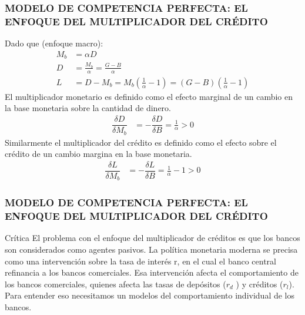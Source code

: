 \begin{frame}\frametitle{{\normalsize MODELO DE COMPETENCIA PERFECTA: EL ENFOQUE DEL MULTIPLICADOR DEL CRÉDITO} {}}
 Dado que (enfoque macro):
  \begin{align}
  M_{b}&=\alpha D   \\ \nonumber
  D&=\frac{M_{b}}{\alpha}=\frac{G-B}{\alpha}  \\ \nonumber
  L&=D-M_{b}=M_{b}\left(\frac{1}{\alpha}-1 \right)=\left(G-B \right)\left( \frac{1}{\alpha}-1\right)  
  \end{align}   
  El multiplicador monetario es definido como el efecto marginal de un cambio en la base monetaria sobre la cantidad de dinero.  
  \begin{align}
  \dfrac{\delta D}{\delta M_{b}}&=-\dfrac{\delta D}{\delta B}=\frac{1}{\alpha}>0 \nonumber
  \end{align}    
  Similarmente el multiplicador del crédito es definido como el efecto sobre el crédito de un cambio margina en la base monetaria.
  \begin{align}
  \dfrac{\delta L}{\delta M_{b}}&=-\dfrac{\delta L}{\delta B}=\frac{1}{\alpha}-1>0 \nonumber
  \end{align}   
  
\end{frame}




\begin{frame}\frametitle{{\normalsize MODELO DE COMPETENCIA PERFECTA: EL ENFOQUE DEL MULTIPLICADOR DEL CRÉDITO} {}}
   
   \begin{block} {Crítica}
    El problema con el enfoque del multiplicador de créditos es que los bancos son considerados como agentes pasivos. La política monetaria moderna se precisa como una intervención sobre la tasa de interés r, en el cual el banco central refinancia a los bancos comerciales. Esa intervención afecta el comportamiento de los bancos comerciales, quienes afecta las tasas de depósitos ($r_{d}$ ) y créditos ($r_{l}$). Para entender eso necesitamos un modelos del comportamiento individual de los bancos.      
       
   \end{block}	 
    
   
    
\end{frame}



